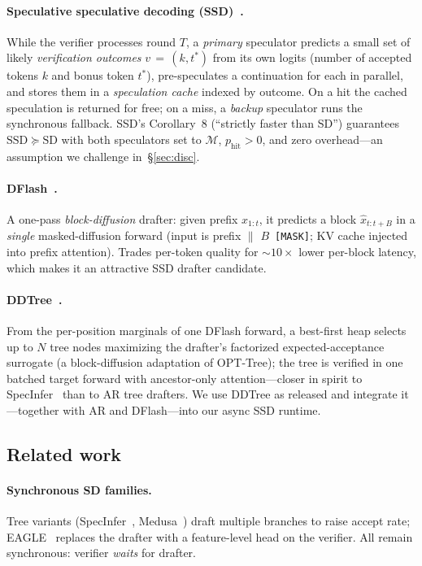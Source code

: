 \documentclass{article}
\begin{document}
\paragraph{Speculative speculative decoding (SSD)~\citep{kumar2026ssd}.}
While the verifier processes round $T$, a \emph{primary} speculator predicts a small set of likely \emph{verification outcomes} $v\,{=}\,(k,t^*)$ from its own logits (number of accepted tokens $k$ and bonus token $t^*$), pre-speculates a continuation for each in parallel, and stores them in a \emph{speculation cache} indexed by outcome.
On a hit the cached speculation is returned for free; on a miss, a \emph{backup} speculator runs the synchronous fallback.
SSD's Corollary~8 (``strictly faster than SD'') guarantees $\mathrm{SSD}\succeq\mathrm{SD}$ with both speculators set to $\mathcal{M}$, $p_{\text{hit}}{>}0$, and zero overhead---an assumption we challenge in~\S\ref{sec:disc}.

\paragraph{DFlash~\citep{dflash2025}.}
A one-pass \emph{block-diffusion} drafter: given prefix $x_{1:t}$, it predicts a block $\hat{x}_{t:t+B}$ in a \emph{single} masked-diffusion forward (input is prefix $\|$ $B$~\texttt{[MASK]}; KV cache injected into prefix attention).
Trades per-token quality for ${\sim}10{\times}$ lower per-block latency, which makes it an attractive SSD drafter candidate.

\paragraph{DDTree~\citep{ringel2026ddtree}.}
From the per-position marginals of one DFlash forward, a best-first heap selects up to $N$ tree nodes maximizing the drafter's factorized expected-acceptance surrogate (a block-diffusion adaptation of OPT-Tree); the tree is verified in one batched target forward with ancestor-only attention---closer in spirit to SpecInfer~\citep{miao2024specinfer} than to AR tree drafters.
We use DDTree as released and integrate it---together with AR and DFlash---into our async SSD runtime.

\subsection{Related work}

\paragraph{Synchronous SD families.}
Tree variants (SpecInfer~\citep{miao2024specinfer}, Medusa~\citep{cai2024medusa}) draft multiple branches to raise accept rate; EAGLE~\citep{li2024eagle} replaces the drafter with a feature-level head on the verifier.
All remain synchronous: verifier \emph{waits} for drafter.
\end{document}
